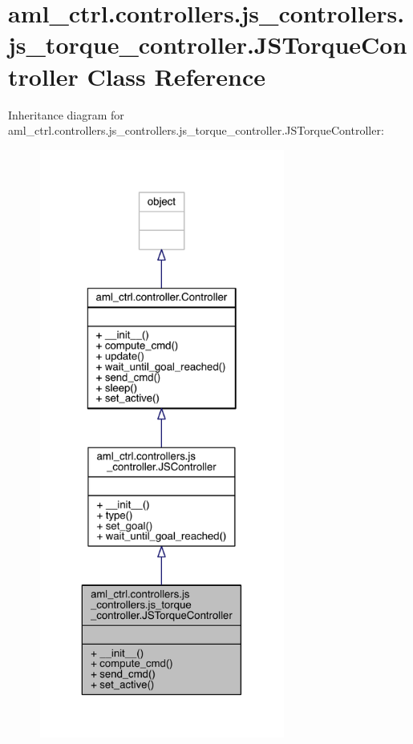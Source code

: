 \hypertarget{classaml__ctrl_1_1controllers_1_1js__controllers_1_1js__torque__controller_1_1_j_s_torque_controller}{}\section{aml\+\_\+ctrl.\+controllers.\+js\+\_\+controllers.\+js\+\_\+torque\+\_\+controller.\+J\+S\+Torque\+Controller Class Reference}
\label{classaml__ctrl_1_1controllers_1_1js__controllers_1_1js__torque__controller_1_1_j_s_torque_controller}


Inheritance diagram for aml\+\_\+ctrl.\+controllers.\+js\+\_\+controllers.\+js\+\_\+torque\+\_\+controller.\+J\+S\+Torque\+Controller\+:\nopagebreak
\begin{figure}[H]
\begin{center}
\leavevmode
\includegraphics[height=550pt]{classaml__ctrl_1_1controllers_1_1js__controllers_1_1js__torque__controller_1_1_j_s_torque_controller__inherit__graph}
\end{center}
\end{figure}


